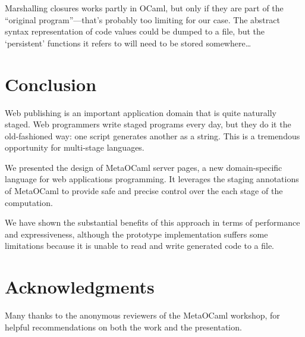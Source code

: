 \documentclass[preprint]{acm_proc_article-sp}
\def\MOC{MetaOCaml\xspace}
\begin{document}
  Marshalling closures works partly in OCaml, but only if they
  are part of the ``original program''---that's probably too
  limiting for our case.  The abstract syntax representation of
  code values could be dumped to a file, but the `persistent'
  functions it refers to will need to be stored somewhere\ldots



\section{Conclusion}
\label{sec:concl}

Web publishing is an important application domain that is quite
naturally staged.  Web programmers write staged programs every
day, but they do it the old-fashioned way: one script generates
another as a string.  This is a tremendous opportunity for
multi-stage languages.

We presented the design of \MOC{} server pages, a new
domain-specific language for web applications programming.  It
leverages the staging annotations of \MOC{} to provide safe and
precise control over the each stage of the computation.

We have shown the substantial benefits of this approach in terms
of performance and expressiveness, although the prototype
implementation suffers some limitations because it is unable to
read and write generated code to a file.

\section*{Acknowledgments}

Many thanks to the anonymous reviewers of the \MOC workshop, for
helpful recommendations on both the work and the presentation.


\raggedright

\end{document}
